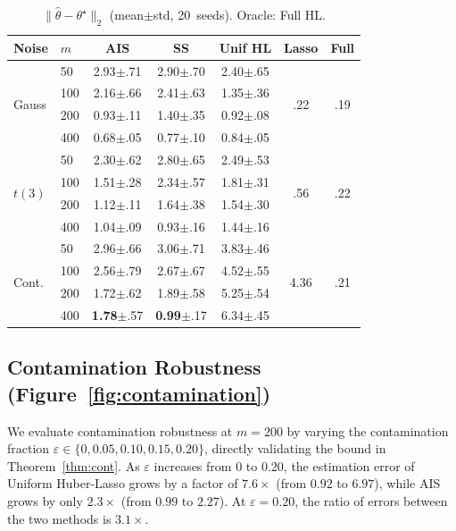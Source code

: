 \documentclass[10pt]{article}
\newcommand{\hth}{\hat{\theta}}
\newcommand{\ts}{\theta^{\star}}
\begin{document}
\begin{table}[t]
\centering
\caption{$\|\hth-\ts\|_2$ (mean$\pm$std, 20~seeds). Oracle: Full HL.}
\label{tab:synthetic}
\setlength\tabcolsep{2.5pt}
\scriptsize
\begin{tabular}{llccccc}
\toprule
Noise & $m$ & AIS & SS & Unif HL & Lasso & Full\\
\midrule
\multirow{4}{*}{Gauss}
 & 50  & 2.93{\tiny$\pm$.71} & 2.90{\tiny$\pm$.70} & 2.40{\tiny$\pm$.65} & \multirow{4}{*}{.22} & \multirow{4}{*}{.19}\\
 & 100 & 2.16{\tiny$\pm$.66} & 2.41{\tiny$\pm$.63} & 1.35{\tiny$\pm$.36} &&\\
 & 200 & 0.93{\tiny$\pm$.11} & 1.40{\tiny$\pm$.35} & 0.92{\tiny$\pm$.08} &&\\
 & 400 & 0.68{\tiny$\pm$.05} & 0.77{\tiny$\pm$.10} & 0.84{\tiny$\pm$.05} &&\\
\midrule
\multirow{4}{*}{$t(3)$}
 & 50  & 2.30{\tiny$\pm$.62} & 2.80{\tiny$\pm$.65} & 2.49{\tiny$\pm$.53} & \multirow{4}{*}{.56} & \multirow{4}{*}{.22}\\
 & 100 & 1.51{\tiny$\pm$.28} & 2.34{\tiny$\pm$.57} & 1.81{\tiny$\pm$.31} &&\\
 & 200 & 1.12{\tiny$\pm$.11} & 1.64{\tiny$\pm$.38} & 1.54{\tiny$\pm$.30} &&\\
 & 400 & 1.04{\tiny$\pm$.09} & 0.93{\tiny$\pm$.16} & 1.44{\tiny$\pm$.16} &&\\
\midrule
\multirow{4}{*}{Cont.}
 & 50  & 2.96{\tiny$\pm$.66} & 3.06{\tiny$\pm$.71} & 3.83{\tiny$\pm$.46} & \multirow{4}{*}{4.36} & \multirow{4}{*}{.21}\\
 & 100 & 2.56{\tiny$\pm$.79} & 2.67{\tiny$\pm$.67} & 4.52{\tiny$\pm$.55} &&\\
 & 200 & 1.72{\tiny$\pm$.62} & 1.89{\tiny$\pm$.58} & 5.25{\tiny$\pm$.54} &&\\
 & 400 & \textbf{1.78}{\tiny$\pm$.57} & \textbf{0.99}{\tiny$\pm$.17} & 6.34{\tiny$\pm$.45} &&\\
\bottomrule
\end{tabular}
\end{table}

\subsection{Contamination Robustness (Figure~\ref{fig:contamination})}

We evaluate contamination robustness at $m{=}200$ by varying the contamination
fraction $\varepsilon\in\{0,0.05,0.10,0.15,0.20\}$, directly validating the
bound in Theorem~\ref{thm:cont}.
As $\varepsilon$ increases from $0$ to $0.20$, the estimation error of Uniform
Huber-Lasso grows by a factor of $7.6\times$ (from $0.92$ to $6.97$), while AIS
grows by only $2.3\times$ (from $0.99$ to $2.27$). At $\varepsilon{=}0.20$,
the ratio of errors between the two methods is $3.1\times$.
\end{document}
